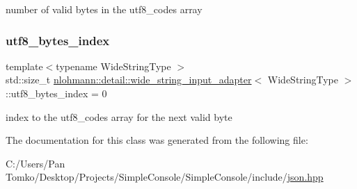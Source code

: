 number of valid bytes in the utf8\+\_\+codes array 

\mbox{\label{classnlohmann_1_1detail_1_1wide__string__input__adapter_a6d87bc3e8b427e06cda936383283e0c4}} 
\subsubsection{\texorpdfstring{utf8\_bytes\_index}{utf8\_bytes\_index}}
{\footnotesize\ttfamily template$<$typename Wide\+String\+Type $>$ \\
std\+::size\+\_\+t \mbox{\hyperlink{classnlohmann_1_1detail_1_1wide__string__input__adapter}{nlohmann\+::detail\+::wide\+\_\+string\+\_\+input\+\_\+adapter}}$<$ Wide\+String\+Type $>$\+::utf8\+\_\+bytes\+\_\+index = 0\hspace{0.3cm}{\ttfamily [private]}}



index to the utf8\+\_\+codes array for the next valid byte 



The documentation for this class was generated from the following file\+:\begin{DoxyCompactItemize}
\item 
C\+:/\+Users/\+Pan Tomko/\+Desktop/\+Projects/\+Simple\+Console/\+Simple\+Console/include/\mbox{\hyperlink{json_8hpp}{json.\+hpp}}\end{DoxyCompactItemize}
